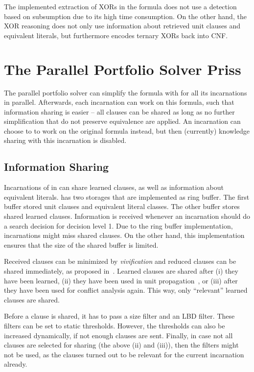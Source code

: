 \documentclass[conference]{IEEEtran}
\begin{document}
The implemented extraction of XORs in the formula does not use a detection based on subsumption due to its high time consumption. 
On the other hand, the XOR reasoning does not only use information about retrieved unit clauses and equivalent literals, but furthermore encodes ternary XORs back into CNF. 

\section{The Parallel Portfolio Solver Priss}

The parallel portfolio solver \priss can simplify the formula with \coprocessor for all its incarnations in parallel. 
Afterwards, each incarnation can work on this formula, such that information sharing is easier -- all clauses can be shared as long as no further simplification that do not preserve equivalence are applied. 
An incarnation can choose to to work on the original formula instead, but then (currently) knowledge sharing with this incarnation is disabled. 

\subsection{Information Sharing}

Incarnations of \riss in \priss can share learned clauses, as well as information about equivalent literals. 
\priss has two storages that are implemented as ring buffer. 
The first buffer stored unit clauses and equivalent literal classes. 
The other buffer stores shared learned clauses. 
Information is received whenever an incarnation should do a search decision for decision level 1. 
Due to the ring buffer implementation, incarnations might miss shared clauses. 
On the other hand, this implementation ensures that the size of the shared buffer is limited. 

Received clauses can be minimized by \emph{vivification} and reduced clauses can be shared immediately, as proposed in~\cite{DBLP:conf/sat/WieringaH13}. 
Learned clauses are shared after (i) they have been learned, (ii) they have been used in unit propagation~\cite{glucose4sharing}, or (iii) after they have been used for conflict analysis again. 
This way, only ``relevant'' learned clauses are shared. 

Before a clause is shared, it has to pass a size filter and an LBD filter. 
These filters can be set to static thresholds. 
However, the thresholds can also be increased dynamically, if not enough clauses are sent. 
Finally, in case not all clauses are selected for sharing (the above (ii) and (iii)), then the filters might not be used, as the clauses turned out to be relevant for the current incarnation already. 
\end{document}
